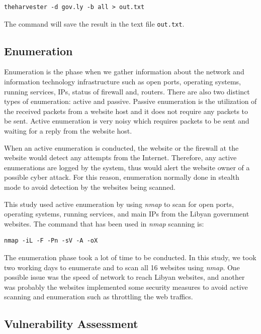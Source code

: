 \documentclass[conference,letterpaper]{IEEEtran}
\begin{document}
\begin{verbatim}
theharvester -d gov.ly -b all > out.txt
\end{verbatim}

The command will save the result in the text file
\verb|out.txt|. 



\subsection{Enumeration}

Enumeration is the phase when we gather information about the network
and information technology infrastructure such as open ports,
operating systems, running services, IPs, status of firewall and,
routers\cite{mehta2018penetration}. There are also two distinct types
of enumeration: active and passive. Passive enumeration is the
utilization of the received packets from a website host and it does
not require any packets to be sent.  Active enumeration is very noisy
which requires packets to be sent and waiting for a reply from the
website host.

When an active enumeration is conducted, the website or the firewall
at the website would detect any attempts from the Internet. Therefore,
any active enumerations are logged by the system, thus would alert the
website owner of a possible cyber attack. For this reason, enumeration
normally done in stealth mode to avoid detection by the websites being
scanned.

This study used active enumeration by using \emph{nmap}\cite{
  lyon2009nmap} to scan for open ports, operating systems, running
services, and main IPs from the Libyan government websites. The
command that has been used in \emph{nmap} scanning is:

\begin{verbatim}
nmap -iL -F -Pn -sV -A -oX
\end{verbatim}

The enumeration phase took a lot of time to be conducted. In this
study, we took two working days to enumerate and to scan all 16
websites using \emph{nmap}. One possible issue was the speed of
network to reach Libyan websites, and another was probably the
websites implemented some security measures to avoid active scanning
and enumeration such as throttling the web traffics.

\subsection{Vulnerability Assessment} 
\end{document}
